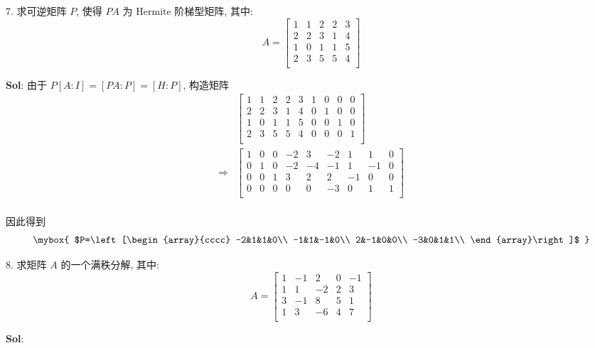 
7. 求可逆矩阵 $P$, 使得 $PA$ 为 $\text{Hermite}$ 阶梯型矩阵, 其中: 
$$
A=\begin{bmatrix}
1&1&2&2&3\\
2&2&3&1&4\\
1&0&1&1&5\\
2&3&5&5&4\\
\end{bmatrix}
$$

\textbf{Sol}:
由于 $P[A:I]=[PA:P]=[H:P]$, 构造矩阵
$$
\begin{aligned}
&\left[\begin{array}{ccccc|cccc}
    1&1&2&2&3&1&0&0&0\\
    2&2&3&1&4&0&1&0&0\\
    1&0&1&1&5&0&0&1&0\\
    2&3&5&5&4&0&0&0&1\\
\end{array}\right]\\
\Rightarrow&
\left[\begin{array}{ccccc|cccc}
    1&0&0&-2&3&-2&1&1&0\\
    0&1&0&-2&-4&-1&1&-1&0\\
    0&0&1&3&2&2&-1&0&0\\
    0&0&0&0&0&-3&0&1&1\\
\end{array}\right]\\
\end{aligned}
$$

因此得到 
$$
\mybox{
$P=\left[\begin{array}{cccc}
    -2&1&1&0\\
    -1&1&-1&0\\
    2&-1&0&0\\
    -3&0&1&1\\
\end{array}\right]$
}
$$

\vspace{12pt}

8. 求矩阵 $A$ 的一个满秩分解, 其中:
$$
A=\begin{bmatrix}
    1&-1&2&0&-1\\
    1&1&-2&2&3\\
    3&-1&8&5&1\\
    1&3&-6&4&7\\
\end{bmatrix}
$$

\textbf{Sol}:

